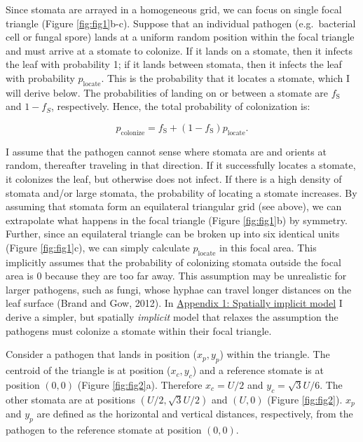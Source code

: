 \documentclass[utf8]{frontiersSCNS}
\newcommand{\fs}{$f_\text{S}$}
\begin{document}
Since stomata are arrayed in a homogeneous grid, we can focus on single
focal triangle (Figure \ref{fig:fig1}b-c). Suppose that an individual
pathogen (e.g.~bacterial cell or fungal spore) lands at a uniform random
position within the focal triangle and must arrive at a stomate to
colonize. If it lands on a stomate, then it infects the leaf with
probability 1; if it lands between stomata, then it infects the leaf
with probability \(p_\text{locate}\). This is the probability that it
locates a stomate, which I will derive below. The probabilities of
landing on or between a stomate are \fs{} and \(1 - f_S\), respectively.
Hence, the total probability of colonization is:

\begin{equation}
  \label{eq:p_colonize}
  p_\text{colonize} = f_\text{S} + (1 - f_\text{S}) p_\text{locate}.
\end{equation}

I assume that the pathogen cannot sense where stomata are and orients at
random, thereafter traveling in that direction. If it successfully
locates a stomate, it colonizes the leaf, but otherwise does not infect.
If there is a high density of stomata and/or large stomata, the
probability of locating a stomate increases. By assuming that stomata
form an equilateral triangular grid (see above), we can extrapolate what
happens in the focal triangle (Figure \ref{fig:fig1}b) by symmetry.
Further, since an equilateral triangle can be broken up into six
identical units (Figure \ref{fig:fig1}c), we can simply calculate
\(p_\text{locate}\) in this focal area. This implicitly assumes that the
probability of colonizing stomata outside the focal area is 0 because
they are too far away. This assumption may be unrealistic for larger
pathogens, such as fungi, whose hyphae can travel longer distances on
the leaf surface (Brand and Gow, 2012). In
\protect\hyperlink{appendix-1-spatially-implicit-model}{Appendix 1:
Spatially implicit model} I derive a simpler, but spatially
\emph{implicit} model that relaxes the assumption the pathogens must
colonize a stomate within their focal triangle.

Consider a pathogen that lands in position (\(x_p,y_p\)) within the
triangle. The centroid of the triangle is at position (\(x_c,y_c\)) and
a reference stomate is at position \((0,0)\) (Figure \ref{fig:fig2}a).
Therefore \(x_c = U / 2\) and \(y_c = \sqrt{3} U / 6\). The other
stomata are at positions \((U/2, \sqrt{3} U /2)\) and \((U,0)\) (Figure
\ref{fig:fig2}). \(x_p\) and \(y_p\) are defined as the horizontal and
vertical distances, respectively, from the pathogen to the reference
stomate at position \((0,0)\).
\end{document}
